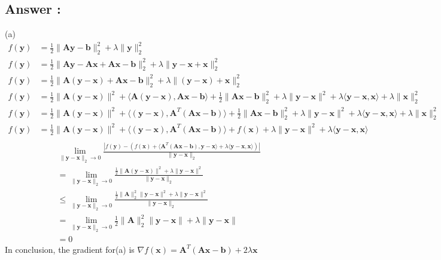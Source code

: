 \documentclass[a4paper,12pt]{article}
\begin{document}
\subsection*{Answer :}
(a)
\begin{align*}
    f(\bm{y}) &= \frac{1}{2} \|\bm{A}\bm{y} - \bm{b}\|_2^2 + \lambda\|\bm{y}\|_2^2 \\
    f(\bm{y}) &= \frac{1}{2} \|\bm{A}\bm{y} - \bm{A}\bm{x} + \bm{A}\bm{x} - \bm{b}\|_2^2 + \lambda\|\bm{y} - \bm{x} + \bm{x}\|_2^2 \\
    f(\bm{y}) &= \frac{1}{2} \|\bm{A}(\bm{y} - \bm{x}) + \bm{A}\bm{x} - \bm{b}\|_2^2 + \lambda\|(\bm{y} - \bm{x}) + \bm{x}\|_2^2 \\
    f(\bm{y}) &= \frac{1}{2} \|\bm{A}(\bm{y} - \bm{x})\|^2 + \langle \bm{A} (\bm{y} - \bm{x}), \bm{A}\bm{x} -\bm{b} \rangle+ \frac{1}{2}\|\bm{A}\bm{x} - \bm{b}\|_2^2 + \lambda\|\bm{y} - \bm{x}\|^2 + \lambda\langle \bm{y} - \bm{x}, \bm{x}\rangle + \lambda\|\bm{x}\|_2^2 \\
    f(\bm{y}) &= \frac{1}{2} \|\bm{A}(\bm{y} - \bm{x})\|^2 + \langle(\bm{y} - \bm{x}), \bm{A}^T(\bm{A}\bm{x} -\bm{b}) \rangle+ \frac{1}{2}\|\bm{A}\bm{x} - \bm{b}\|_2^2 + \lambda\|\bm{y} - \bm{x}\|^2 + \lambda\langle \bm{y} - \bm{x}, \bm{x}\rangle + \lambda\|\bm{x}\|_2^2 \\
    f(\bm{y}) &= \frac{1}{2} \|\bm{A}(\bm{y} - \bm{x})\|^2 + \langle(\bm{y} - \bm{x}), \bm{A}^T(\bm{A}\bm{x} -\bm{b}) \rangle+ f(\bm{x}) + \lambda\|\bm{y} - \bm{x}\|^2 + \lambda\langle \bm{y} - \bm{x}, \bm{x}\rangle \\
\end{align*}
\begin{align*}
    &\lim_{\|\bm{y} - \bm{x}\|_2 \to 0} \frac{ |f(\bm{y}) - (f(\bm{x}) + \langle \bm{A}^T(\bm{A}\bm{x} - \bm{b}), \bm{y} - \bm{x}\rangle + \lambda \langle \bm{y} - \bm{x}, \bm{x} \rangle)| }{\|\bm{y} - \bm{x}\|_2} \\
    &= \lim_{\|\bm{y} - \bm{x}\|_2 \to 0} \frac{\frac{1}{2} \|\bm{A}(\bm{y} - \bm{x})\|^2 + \lambda \| \bm{y} - \bm{x}\|^2}{\|\bm{y} - \bm{x}\|_2} \\
    &\leq \lim_{\|\bm{y} - \bm{x}\|_2 \to 0} \frac{\frac{1}{2} \|\bm{A}\|_2^2\|\bm{y} - \bm{x}\|^2 + \lambda \| \bm{y} - \bm{x}\|^2}{\|\bm{y} - \bm{x}\|_2} \\
    &= \lim_{\|\bm{y} - \bm{x}\|_2 \to 0} \frac{1}{2} \|\bm{A}\|_2^2\|\bm{y} - \bm{x}\| + \lambda \| \bm{y} - \bm{x}\| \\
    &= 0
\end{align*}
In conclusion, the gradient for(a) is \(\nabla f(\bm{x}) = \bm{A}^T(\bm{A}\bm{x} - \bm{b}) + 2\lambda \bm{x}\) \\
\end{document}
